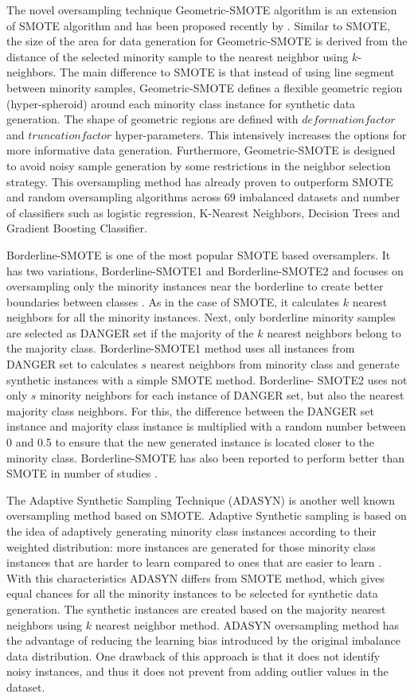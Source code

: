 \documentclass[parskip=full]{scrartcl}
\begin{document}
The novel oversampling technique Geometric-SMOTE algorithm is an extension of
SMOTE algorithm and has been proposed recently by \cite{Douzas2019}. Similar to
SMOTE, the size of the area for data generation for Geometric-SMOTE is derived
from the distance of the selected minority sample to the nearest neighbor using
$k$-neighbors. The main difference to SMOTE is that instead of using line
segment between minority samples, Geometric-SMOTE defines a flexible geometric
region (hyper-spheroid) around each minority class instance for synthetic data
generation. The shape of geometric regions are defined with $deformation
factor$ and $truncation factor$ hyper-parameters. This intensively increases
the options for more informative data generation. Furthermore, Geometric-SMOTE
is designed to avoid noisy sample generation by some restrictions in the
neighbor selection strategy. This oversampling method has already proven to
outperform SMOTE and random oversampling algorithms across 69 imbalanced
datasets and number of classifiers such as logistic regression, K-Nearest
Neighbors, Decision Trees and Gradient Boosting Classifier.

Borderline-SMOTE is one of the most popular SMOTE based oversamplers. It has two
variations, Borderline-SMOTE1 and Borderline-SMOTE2 and focuses on oversampling
only the minority instances near the borderline to create better boundaries
between classes \cite{Han2005}. As in the case of SMOTE, it calculates $k$
nearest neighbors for all the minority instances. Next, only borderline
minority samples are selected as DANGER set if the majority of the $k$ nearest
neighbors belong to the majority class. Borderline-SMOTE1 method uses all
instances from DANGER set to calculates $s$ nearest neighbors from minority
class and generate synthetic instances with a simple SMOTE method. Borderline-
SMOTE2 uses not only $s$ minority neighbors for each instance of DANGER set,
but also the nearest majority class neighbors. For this, the difference between
the DANGER set instance and majority class instance is multiplied with a random
number between 0 and 0.5 to ensure that the new generated instance is located
closer to the minority class. Borderline-SMOTE has also been reported to
perform better than SMOTE in number of studies \cite{Nguyen2009, Ramentol2012}.

The Adaptive Synthetic Sampling Technique (ADASYN) is another well known
oversampling method based on SMOTE. Adaptive Synthetic sampling is based on the
idea of adaptively generating minority class instances according to their
weighted distribution: more instances are generated for those minority class
instances that are harder to learn compared to ones that are easier to learn
\cite{HaiboHe2008}. With this characteristics ADASYN differs from SMOTE method,
which gives equal chances for all the minority instances to be selected for
synthetic data generation. The synthetic instances are created based on the
majority nearest neighbors using $k$ nearest neighbor method. ADASYN
oversampling method has the advantage of reducing the learning bias introduced
by the original imbalance data distribution. One drawback of this approach is
that it does not identify noisy instances, and thus it does not prevent from
adding outlier values in the dataset.
\end{document}
